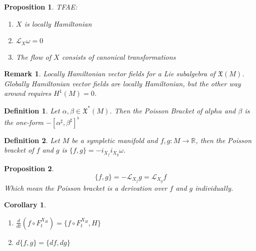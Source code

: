 \documentclass{article}
\newtheorem{defn}{Definition}
\newtheorem{prop}{Proposition}
\newtheorem{rmk}{Remark}
\newtheorem{cor}{Corollary}
\begin{document}
\begin{prop}

TFAE:

\begin{enumerate}
    \item $X$ is locally Hamiltonian
    \item $\mathcal{L}_X \omega = 0$ 
    \item The flow of $X$ consists of canonical transformations
    
\end{enumerate}

\end{prop}

\begin{rmk}

Locally Hamiltonian vector fields for a Lie subalgebra of $\mathfrak{X}(M)$. Globally Hamiltonian vector fields are locally Hamiltonian, but the other way around requires $H^1(M) = 0$. 

\end{rmk}

\begin{defn}

Let $\alpha, \beta \in \mathfrak{X}^*(M)$. Then the Poisson Bracket of $alpha$ and $\beta$ is the one-form $-[\alpha^{\sharp}, \beta^{\sharp}]^{\flat}$

\end{defn}

\begin{defn}

Let $M$ be a sympletic manifold and $f,g: M \to \mathbb{R}$, then the Poisson bracket of $f$ and $g$ is $ \{f,g\} = - i_{X_f} i_{X_g} \omega$.

\end{defn}

\begin{prop}
\[\{f,g\} = - \mathcal{L}_{X_f}g = \mathcal{L}_{X_g}f\]
\indent Which mean the Poisson bracket is a derivation over $f$ and $g$ individually.
\end{prop}

\begin{cor}
\hfill
\begin{enumerate}
    \item $\frac{d}{dt}(f \circ F^{X_H}_t) = \{f \circ F^{X_H}_t, H\}$
    \item $d\{f,g\} = \{df, dg\}$
\end{enumerate}

\end{cor}
\end{document}
